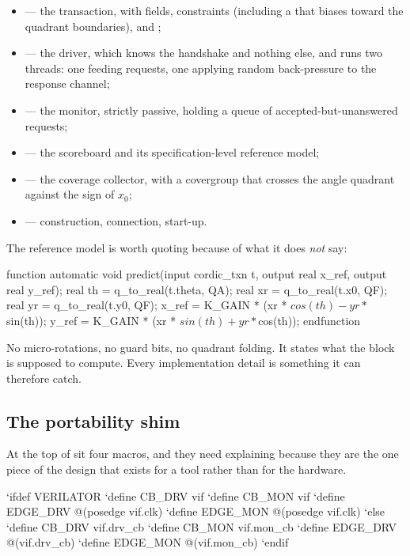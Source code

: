 \begin{itemize}
  \item {} --- the transaction, with  fields,
        constraints (including a  that biases toward the quadrant
        boundaries), and ;
  \item {} --- the driver, which knows the handshake and
        nothing else, and runs two threads: one feeding requests, one
        applying random back-pressure to the response channel;
  \item {} --- the monitor, strictly passive, holding a queue
        of accepted-but-unanswered requests;
  \item {} --- the scoreboard and its specification-level
        reference model;
  \item {} --- the coverage collector, with a covergroup that
        crosses the angle quadrant against the sign of $x_0$;
  \item {} --- construction, connection, start-up.
\end{itemize}

The reference model is worth quoting because of what it does \emph{not} say:

\begin{svcode}
function automatic void predict(input cordic_txn t,
                                output real x_ref, output real y_ref);
  real th = q_to_real(t.theta, QA);
  real xr = q_to_real(t.x0,    QF);
  real yr = q_to_real(t.y0,    QF);
  x_ref = K_GAIN * (xr * $cos(th) - yr * $sin(th));
  y_ref = K_GAIN * (xr * $sin(th) + yr * $cos(th));
endfunction
\end{svcode}

No micro-rotations, no guard bits, no quadrant folding. It states what the
block is supposed to compute. Every implementation detail is something it can
therefore catch.

\subsection{The portability shim}

At the top of  sit four macros, and they need
explaining because they are the one piece of the design that exists for a
tool rather than for the hardware.

\begin{svcode}
`ifdef VERILATOR
  `define CB_DRV       vif
  `define CB_MON       vif
  `define EDGE_DRV     @(posedge vif.clk)
  `define EDGE_MON     @(posedge vif.clk)
`else
  `define CB_DRV       vif.drv_cb
  `define CB_MON       vif.mon_cb
  `define EDGE_DRV     @(vif.drv_cb)
  `define EDGE_MON     @(vif.mon_cb)
`endif
\end{svcode}

